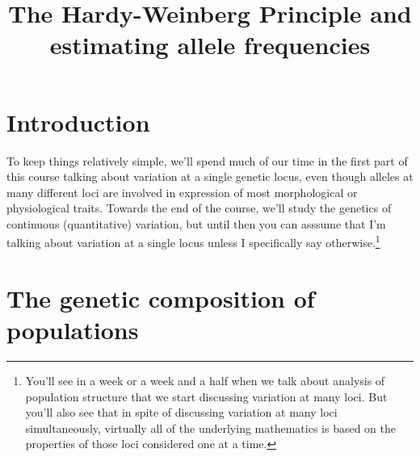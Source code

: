 \documentclass[12pt]{article}
\title{The Hardy-Weinberg Principle and estimating allele frequencies}
\begin{document}
\maketitle

\thispagestyle{first}

\section*{Introduction}

To keep things relatively simple, we'll spend much of our time in the
first part of this course talking about variation at a single genetic
locus, even though alleles at many different loci are involved in
expression of most morphological or physiological traits. Towards the
end of the course, we'll study the genetics of continuous
(quantitative) variation, but until then you can asssume that I'm
talking about variation at a single locus unless I specifically say
otherwise.\footnote{You'll see in a week or a week and a half when we
  talk about analysis of population structure that we start discussing
  variation at many loci. But you'll also see that in spite of
  discussing variation at many loci simultaneously, virtually all of
  the underlying mathematics is based on the properties of those loci
  considered one at a time.}

\section*{The genetic composition of populations}
\end{document}
